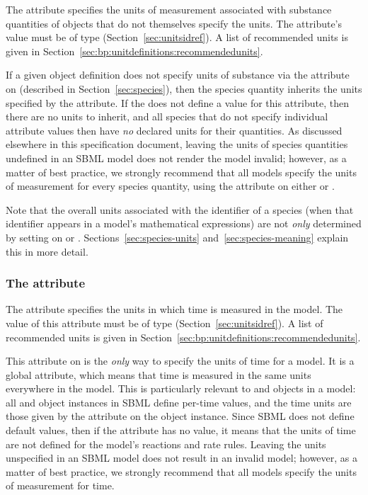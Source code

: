The  attribute specifies the units of
measurement associated with substance quantities of \Species
objects that do not themselves specify the units.  The attribute's
value must be of type 
(Section~\ref{sec:unitsidref}).  A list of recommended units is
given in Section~\ref{sec:bp:unitdefinitions:recommendedunits}.

If a given \Species object definition does not specify units of
substance via the  attribute on \Species
(described in Section~\ref{sec:species}), then the species
quantity inherits the units specified by the \Model
{} attribute.  If the \Model does not define a
value for this attribute, then there are no units to inherit, and
all species that do not specify individual 
attribute values then have \emph{no} declared units for their
quantities.  As discussed elsewhere in this specification
document, leaving the units of species quantities undefined in an
SBML model does not render the model invalid; however, as a matter
of best practice, we strongly recommend that all models specify
the units of measurement for every species quantity, using the
 attribute on either \Model or \Species.

Note that the overall units associated with the identifier of a
species (when that identifier appears in a model's mathematical
expressions) are not \emph{only} determined by setting
 on \Model or \Species.
Sections~\ref{sec:species-units} and~\ref{sec:species-meaning}
explain this in more detail.


\subsubsection{The  attribute}
\label{sec:model-timeUnits}

The  attribute specifies the units in which time
is measured in the model.  The value of this attribute must be of
type  (Section~\ref{sec:unitsidref}).  A
list of recommended units is given in
Section~\ref{sec:bp:unitdefinitions:recommendedunits}.

This attribute on \Model is the \emph{only} way to specify the
units of time for a model.  It is a global attribute, which means
that time is measured in the same units everywhere in the model.
This is particularly relevant to \Reaction and \RateRule objects
in a model: all \Reaction and \RateRule object instances in SBML
define per-time values, and the time units are those given by the
 attribute on the \Model object instance.  Since
SBML \thisL does not define default values, then if the \Model
{} attribute has no value, it means that the units
of time are not defined for the model's reactions and rate rules.
Leaving the units unspecified in an SBML model does not result in
an invalid model; however, as a matter of best practice, we
strongly recommend that all models specify the units of
measurement for time.


